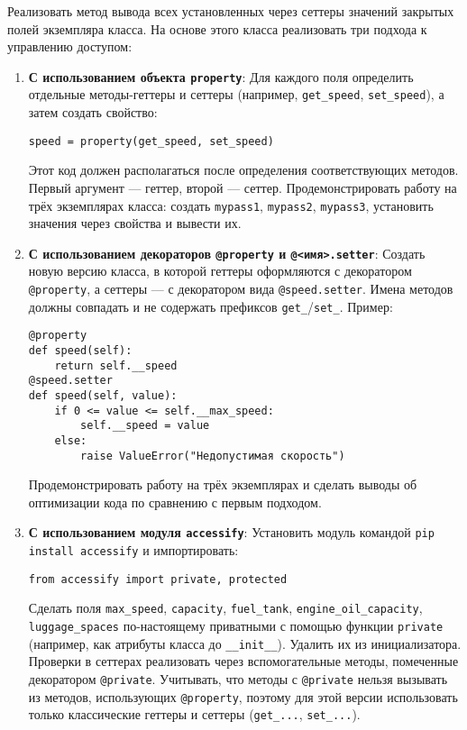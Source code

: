 \begin{enumerate}
\begin{itemize}
\end{itemize}
Реализовать метод вывода всех установленных через сеттеры значений закрытых полей экземпляра класса.
На основе этого класса реализовать три подхода к управлению доступом:
\begin{enumerate}
    \item \textbf{С использованием объекта \texttt{property}}:  
    Для каждого поля определить отдельные методы-геттеры и сеттеры (например, \texttt{get\_speed}, \texttt{set\_speed}), а затем создать свойство:  
    \begin{verbatim}
speed = property(get_speed, set_speed)
    \end{verbatim}  
    Этот код должен располагаться после определения соответствующих методов. Первый аргумент — геттер, второй — сеттер.  
    Продемонстрировать работу на трёх экземплярах класса: создать \texttt{mypass1}, \texttt{mypass2}, \texttt{mypass3}, установить значения через свойства и вывести их.
    \item \textbf{С использованием декораторов \texttt{@property} и \texttt{@<имя>.setter}}:  
    Создать новую версию класса, в которой геттеры оформляются с декоратором \texttt{@property}, а сеттеры — с декоратором вида \texttt{@speed.setter}. Имена методов должны совпадать и не содержать префиксов \texttt{get\_}/\texttt{set\_}.  
    Пример:  
    \begin{verbatim}
@property
def speed(self):
    return self.__speed
@speed.setter
def speed(self, value):
    if 0 <= value <= self.__max_speed:
        self.__speed = value
    else:
        raise ValueError("Недопустимая скорость")
    \end{verbatim}  
    Продемонстрировать работу на трёх экземплярах и сделать выводы об оптимизации кода по сравнению с первым подходом.
    \item \textbf{С использованием модуля \texttt{accessify}}:  
    Установить модуль командой \texttt{pip install accessify} и импортировать:  
    \begin{verbatim}
from accessify import private, protected
    \end{verbatim}  
    Сделать поля \texttt{max\_speed}, \texttt{capacity}, \texttt{fuel\_tank}, \texttt{engine\_oil\_capacity}, \texttt{luggage\_spaces} по-настоящему приватными с помощью функции \texttt{private} (например, как атрибуты класса до \texttt{\_\_init\_\_}). Удалить их из инициализатора.  
    Проверки в сеттерах реализовать через вспомогательные методы, помеченные декоратором \texttt{@private}.  
    Учитывать, что методы с \texttt{@private} нельзя вызывать из методов, использующих \texttt{@property}, поэтому для этой версии использовать только классические геттеры и сеттеры (\texttt{get\_...}, \texttt{set\_...}).  

\end{enumerate}
\end{enumerate}
